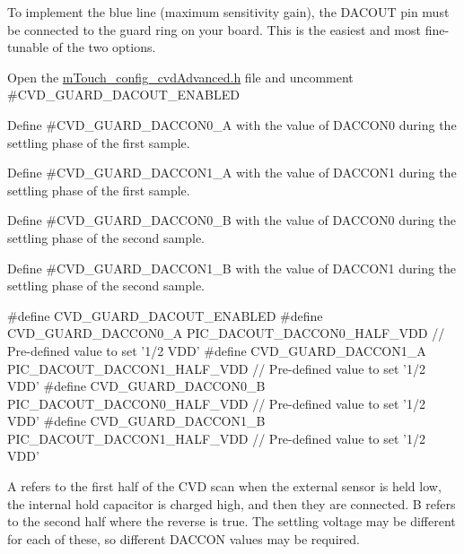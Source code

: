  To implement the blue line (maximum sensitivity gain), the D\+A\+C\+O\+U\+T pin must be connected to the guard ring on your board. This is the easiest and most fine-\/tunable of the two options. 
\begin{DoxyEnumerate}
\item Open the \hyperlink{m_touch__config__cvd_advanced_8h}{m\+Touch\+\_\+config\+\_\+cvd\+Advanced.\+h} file and uncomment \#\+C\+V\+D\+\_\+\+G\+U\+A\+R\+D\+\_\+\+D\+A\+C\+O\+U\+T\+\_\+\+E\+N\+A\+B\+L\+E\+D 
\item Define \#\+C\+V\+D\+\_\+\+G\+U\+A\+R\+D\+\_\+\+D\+A\+C\+C\+O\+N0\+\_\+\+A with the value of D\+A\+C\+C\+O\+N0 during the settling phase of the first sample. 
\item Define \#\+C\+V\+D\+\_\+\+G\+U\+A\+R\+D\+\_\+\+D\+A\+C\+C\+O\+N1\+\_\+\+A with the value of D\+A\+C\+C\+O\+N1 during the settling phase of the first sample. 
\item Define \#\+C\+V\+D\+\_\+\+G\+U\+A\+R\+D\+\_\+\+D\+A\+C\+C\+O\+N0\+\_\+\+B with the value of D\+A\+C\+C\+O\+N0 during the settling phase of the second sample. 
\item Define \#\+C\+V\+D\+\_\+\+G\+U\+A\+R\+D\+\_\+\+D\+A\+C\+C\+O\+N1\+\_\+\+B with the value of D\+A\+C\+C\+O\+N1 during the settling phase of the second sample. 
\begin{DoxyCode}
\textcolor{preprocessor}{#define CVD\_GUARD\_DACOUT\_ENABLED}
\textcolor{preprocessor}{#define CVD\_GUARD\_DACCON0\_A     PIC\_DACOUT\_DACCON0\_HALF\_VDD    // Pre-defined value to set '1/2 VDD'}
\textcolor{preprocessor}{#define CVD\_GUARD\_DACCON1\_A     PIC\_DACOUT\_DACCON1\_HALF\_VDD    // Pre-defined value to set '1/2 VDD'}
\textcolor{preprocessor}{#define CVD\_GUARD\_DACCON0\_B     PIC\_DACOUT\_DACCON0\_HALF\_VDD    // Pre-defined value to set '1/2 VDD'}
\textcolor{preprocessor}{#define CVD\_GUARD\_DACCON1\_B     PIC\_DACOUT\_DACCON1\_HALF\_VDD    // Pre-defined value to set '1/2 VDD'}
\end{DoxyCode}
 \textquotesingle{}A\textquotesingle{} refers to the first half of the C\+V\+D scan when the external sensor is held low, the internal hold capacitor is charged high, and then they are connected. \textquotesingle{}B\textquotesingle{} refers to the second half where the reverse is true. The settling voltage may be different for each of these, so different D\+A\+C\+C\+O\+N values may be required. 
\end{DoxyEnumerate}

